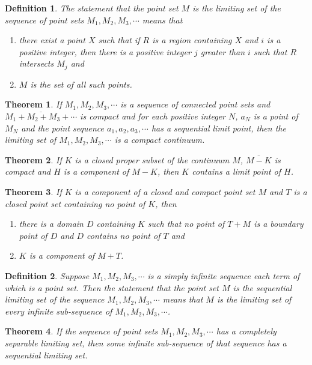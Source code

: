 \documentclass[10pt]{report}
\newtheorem{theorem}{Theorem}
\newtheorem{definition}{Definition}
\newcommand{\cl}[1]{\overline{#1}}
\begin{document}
\begin{definition}
 The statement that the point set $M$ is the limiting set of the sequence of point sets $M_1,M_2,M_3,\cdots$ means that
 \begin{enumerate}
  \item there exist a point $X$ such that if $R$ is a region containing $X$ and $i$ is a positive integer, then there is
a positive integer $j$ greater than $i$ such that $R$ intersects $M_j$ and
  \item $M$ is the set of all such points.
 \end{enumerate}
\end{definition}

\begin{theorem}
 If $M_1,M_2,M_3,\cdots$ is a sequence of connected point sets and $\cl{M_1+M_2+M_3+\cdots}$ is compact and for each
positive integer $N$, $a_N$ is a point of $M_N$ and the point sequence $a_1,a_2,a_3,\cdots$ has a sequential limit
point, then the limiting set of $M_1,M_2,M_3,\cdots$ is a compact continuum.
\end{theorem}

\begin{theorem}
 If $K$ is a closed proper subset of the continuum $M$, $\cl{M-K}$ is compact and $H$ is a component of $M-K$, then $K$
contains a limit point of $H$.
\end{theorem}

\begin{theorem}
 If $K$ is a component of a closed and compact point set $M$ and $T$ is a closed point set containing no point of $K$,
then 
\begin{enumerate}
 \item there is a domain $D$ containing $K$ such that no point of $T+M$ is a boundary point of $D$ and $D$ contains no
point of $T$ and
 \item $K$ is a component of $M+T$.
\end{enumerate}
\end{theorem}

\begin{definition}
 Suppose $M_1,M_2,M_3,\cdots$ is a simply infinite sequence each term of which is a point set. Then the statement that
the point set $M$ is the sequential limiting set of the sequence $M_1,M_2,M_3,\cdots$ means that $M$ is the limiting
set of every infinite sub-sequence of $M_1,M_2,M_3,\cdots$.
\end{definition}

\begin{theorem}
 If the sequence of point sets $M_1,M_2,M_3,\cdots$ has a completely separable limiting set, then some infinite
sub-sequence of that sequence has a sequential limiting set.
\end{theorem}
\end{document}
